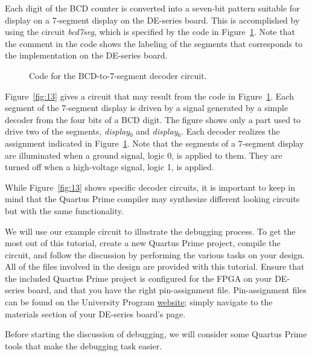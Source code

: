\documentclass[11pt, twoside, pdftex]{article}
\begin{document}
Each digit of the BCD counter is converted into a seven-bit pattern suitable for display
on a 7-segment display on the DE-series board. This is accomplished by using the circuit 
{\it bcd7seg}, which is specified by the code in Figure~\ref{fig:12}. Note that the comment in the code 
shows the labeling of the segments that corresponds to the implementation on the DE-series board.
 
\begin{figure}[H]

	\caption{Code for the BCD-to-7-segment decoder circuit.}
	\label{fig:12}
\end{figure}
 

Figure~\ref{fig:13} gives a circuit that may result from the code in Figure~\ref{fig:12}.
Each segment of the 7-segment display is driven by a signal generated
by a simple decoder from the four bits of a BCD digit. The figure shows
only a part used to drive two of the segments, {\it display}$_0$ 
and {\it display}$_6$.
Each decoder realizes the assignment indicated in Figure~\ref{fig:12}.
Note that the segments of a 7-segment display are illuminated when a ground
signal, logic 0, is applied to them. They are turned off when a high-voltage
signal, logic 1, is applied.

While Figure~\ref{fig:13} shows specific decoder circuits, it is important to keep in mind
that the Quartus Prime compiler may synthesize different looking circuits but with
the same functionality.
 
We will use our example circuit to illustrate the debugging process.
To get the most out of this tutorial, create a new Quartus Prime project,
compile the circuit, and follow the discussion by performing the various
tasks on your design. All of the files involved in the design are provided
with this tutorial. Ensure that the included Quartus Prime project is configured for the FPGA on your DE-series board, and that you have the right pin-assignment file. Pin-assignment files can be found on the University Program \href{https://www.altera.com/support/training/university/boards.html}{website}; simply navigate to the materials section of your DE-series board's page.

Before starting the discussion of debugging, we will consider some Quartus Prime 
tools that make the debugging task easier.    
\end{document}
